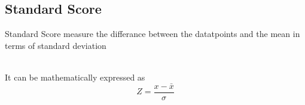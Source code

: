 \documentclass[twoside,12pt]{report}  %
\renewcommand{\thefigure}{\thechapter-\arabic{figure}} %
\begin{document}
\subsection{Standard Score}
\begin{tcolorbox}[colback=red!5!white, colframe=red!75!black, title = \textbf{Example}]
	Standard Score measure the differance between the datatpoints and the mean in terms of standard deviation
\end{tcolorbox}
\noindent
\\
It can be mathematically expressed as 
$$ Z = \frac{x-\bar{x}}{\sigma} $$

%
%


\renewcommand{\thechapter}{\Alph{chapter}}
\renewcommand{\thefigure}{\thechapter-\arabic{figure}}
\setcounter{figure}{0}


\appendix
\end{document}
